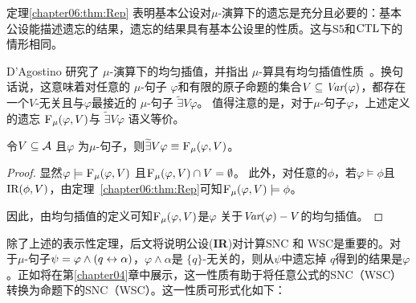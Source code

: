 定理\ref{chapter06:thm:Rep} 表明基本公设对$\mu$-演算下的遗忘是充分且必要的：基本公设能描述遗忘的结果，遗忘的结果具有基本公设里的性质。这与S5和$\textrm{CTL}$下的情形相同。

D'Agostino 研究了 $\mu$-演算下的均匀插值，并指出 $\mu$-算具有均匀插值性质~\cite{d1996uniform,d2000logical,d2006modal}。换句话说，这意味着对任意的 $\mu$-句子 $\varphi$和有限的原子命题的集合$V\subseteq \textit{Var}(\varphi)$，都存在一个$V$-无关且与$\varphi$最接近的 $\mu$-句子 $\widetilde{\exists}V \varphi$。
值得注意的是，对于$\mu$-句子$\varphi$，上述定义的遗忘 ${\textsc{F}_{\textsc{$\mu$}}}(\varphi, V)$与 $\widetilde{\exists}V \varphi$\cite{d2006modal} 语义等价。

\begin{corollary}\label{cor:unifeqforget}
	令$V \subseteq {\cal A}$ 且$\varphi$ 为$\mu$-句子，则$\widetilde{\exists}V \varphi \equiv {\textsc{F}_{\textsc{$\mu$}}}(\varphi, V)$。
\end{corollary}
\begin{proof}
	显然$\varphi \models {\textsc{F}_{\textsc{$\mu$}}}(\varphi, V)$ 且${\textsc{F}_{\textsc{$\mu$}}}(\varphi, V) \cap V = \emptyset$。
	此外，对任意的$\phi$，若$\varphi \models \phi$且$\textrm{IR}(\phi, V)$，由定理~\ref{chapter06:thm:Rep}可知${\textsc{F}_{\textsc{$\mu$}}}(\varphi, V) \models \phi$。 
	
	因此，由均匀插值的定义可知${\textsc{F}_{\textsc{$\mu$}}}(\varphi, V)$是$\varphi$ 关于$\textit{Var}(\varphi)-V$的均匀插值。 
\end{proof}

除了上述的表示性定理，后文将说明公设(\textbf{IR})对计算SNC 和 WSC是重要的。对于$\mu$-句子$\psi = \varphi \wedge (q \leftrightarrow \alpha)$，$\varphi \wedge \alpha$是 $\{q\}$-无关的，则从$\psi$中遗忘掉 $q$得到的结果是$\varphi$。正如将在第\ref{chapter04}章中展示，这一性质有助于将任意公式的SNC（WSC）转换为命题下的SNC（WSC）。这一性质可形式化如下：

